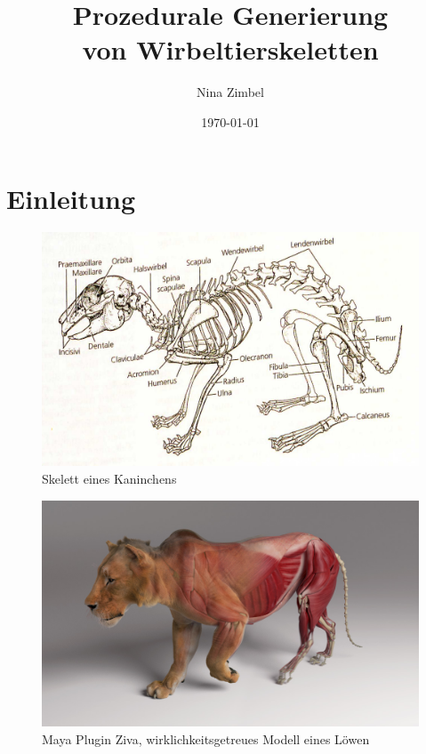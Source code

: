 \documentclass{beamer}
\title{Prozedurale Generierung\\ von Wirbeltierskeletten}
\author{Nina Zimbel}
\institute{KIT - Institut für Visualisierung und Datenanalyse}
\date{\today}
\begin{document}
\begin{frame}
 \maketitle
\end{frame}


\section{Einleitung}
\begin{frame}
 \begin{figure}
  \centering
  \includegraphics[width=\textwidth]{graphics/kaninchen.jpg}
  \caption{Skelett eines Kaninchens \cite{Spezielle_Zoologie}}
 \end{figure}
\end{frame}

\begin{frame}
 \begin{figure}
  \centering
  \includegraphics[width=\textwidth]{graphics/ziva-post2.jpg}
  \caption{Maya Plugin Ziva, wirklichkeitsgetreues Modell eines Löwen \cite{Ziva_Lion}}
 \end{figure}
\end{frame}
\end{document}
